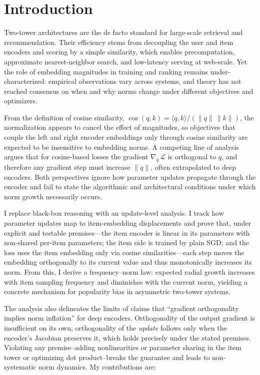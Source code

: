 \section{Introduction}
Two-tower architectures are the de facto standard for large-scale retrieval and recommendation. Their efficiency stems from decoupling the user and item encoders and scoring by a simple similarity, which enables precomputation, approximate nearest-neighbor search, and low-latency serving at web-scale. Yet the role of embedding magnitudes in training and ranking remains under-characterized: empirical observations vary across systems, and theory has not reached consensus on when and why norms change under different objectives and optimizers.

From the definition of cosine similarity, \(\cos(q,k)=\langle q,k\rangle/(\|q\|\,\|k\|)\), the normalization appears to cancel the effect of magnitudes, so objectives that couple the left and right encoder embeddings only through cosine similarity are expected to be insensitive to embedding norms. A competing line of analysis argues that for cosine-based losses the gradient \(\nabla_{q}\,\mathcal{L}\) is orthogonal to \(q\), and therefore any gradient step must increase \(\|q\|\), often extrapolated to deep encoders. Both perspectives ignore how parameter updates propagate through the encoder and fail to state the algorithmic and architectural conditions under which norm growth necessarily occurs.

I replace black-box reasoning with an update-level analysis. I track how parameter updates map to item-embedding displacements and prove that, under explicit and testable premises—the item encoder is linear in its parameters with non-shared per-item parameters; the item side is trained by plain SGD; and the loss uses the item embedding only via cosine similarities—each step moves the embedding orthogonally to its current value and thus monotonically increases its norm. From this, I derive a frequency--norm law: expected radial growth increases with item sampling frequency and diminishes with the current norm, yielding a concrete mechanism for popularity bias in asymmetric two-tower systems.

The analysis also delineates the limits of claims that ``gradient orthogonality implies norm inflation'' for deep encoders. Orthogonality of the output gradient is insufficient on its own; orthogonality of the \emph{update} follows only when the encoder's Jacobian preserves it, which holds precisely under the stated premises. Violating any premise--adding nonlinearities or parameter sharing in the item tower or optimizing dot product--breaks the guarantee and leads to non-systematic norm dynamics. My contributions are:


